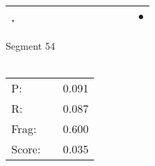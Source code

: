 \documentclass[landscape]{article}
\newcommand{\ssp}{\hspace{2pt}}
\newcommand{\mex}{\cellcolor{g}$\bullet$}
\begin{document}
\begin{tabular}{|l|p{10pt}|p{10pt}|p{10pt}|p{10pt}|p{10pt}|p{10pt}|p{10pt}|p{10pt}|p{10pt}|p{10pt}|p{10pt}|}
\hline
\ssp \cellcolor{ref10}. \ssp&\hspace{2pt}&\hspace{2pt}&\hspace{2pt}&\hspace{2pt}&\hspace{2pt}&\hspace{2pt}&\hspace{2pt}&\hspace{2pt}&\hspace{2pt}&\hspace{2pt}&\hspace{2pt}\mex\\
\hline
\end{tabular}

\vspace{6pt}
\noindent Segment 54\\\\
\noindent\begin{tabular}{lm{12pt}r}
\hline
P:&&0.091\\
R:&&0.087\\
Frag:&&0.600\\
Score:&&0.035\\
\end{tabular}

\newpage
\end{document}
